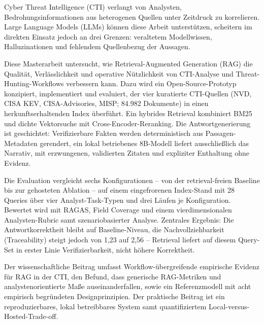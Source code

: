 Cyber Threat Intelligence (CTI) verlangt von Analysten, Bedrohungs\-informationen
aus heterogenen Quellen unter Zeitdruck zu korrelieren. Large Language
Models (LLMs) k\"onnen diese Arbeit unterst\"utzen, scheitern im direkten
Einsatz jedoch an drei Grenzen: veraltetem Modellwissen, Halluzinationen
und fehlendem Quellenbezug der Aussagen.

Diese Masterarbeit untersucht, wie Retrieval-Augmented Generation (RAG)
die Qualit\"at, Verl\"asslichkeit und operative N\"utzlichkeit von
CTI-Analyse und Threat-Hunting-Workflows verbessern kann. Dazu wird ein
Open-Source-Prototyp konzipiert, implementiert und evaluiert, der vier
kuratierte CTI-Quellen (NVD, CISA KEV, CISA-Advisories, MISP; 84.982
Dokumente) in einen herkunfts\-erhaltenden Index \"uberf\"uhrt. Ein
hybrides Retrieval kombiniert BM25 und dichte Vektorsuche mit
Cross-Encoder-Reranking. Die Antwortgenerierung ist geschichtet:
Verifizierbare Fakten werden deterministisch aus Passagen-Metadaten
gerendert, ein lokal betriebenes 8B-Modell liefert ausschlie\ss lich das
Narrativ, mit erzwungenen, validierten Zitaten und expliziter
Enthaltung ohne Evidenz.

Die Evaluation vergleicht sechs Konfigurationen -- von der
retrieval-freien Baseline bis zur gehosteten Ablation -- auf einem
eingefrorenen Index-Stand mit 28 Queries \"uber vier
Analyst-Task-Typen und drei L\"aufen je Konfiguration. Bewertet wird
mit RAGAS, Field Coverage und einem vierdimensionalen
Analysten-Rubric samt szenariobasierter Analyse. Zentrales Ergebnis:
Die Antwortkorrektheit bleibt auf Baseline-Niveau, die
Nachvollziehbarkeit (Traceability) steigt jedoch von 1,23 auf 2,56 --
Retrieval liefert auf diesem Query-Set in erster Linie
Verifizierbarkeit, nicht h\"ohere Korrektheit.

Der wissenschaftliche Beitrag umfasst Workflow-\"ubergreifende
empirische Evidenz f\"ur RAG in der CTI, den Befund, dass generische
RAG-Metriken und analystenorientierte Ma\ss e auseinanderfallen, sowie
ein Referenzmodell mit acht empirisch begr\"undeten Designprinzipien.
Der praktische Beitrag ist ein reproduzierbares, lokal betreibbares
System samt quantifiziertem Local-versus-Hosted-Trade-off.
